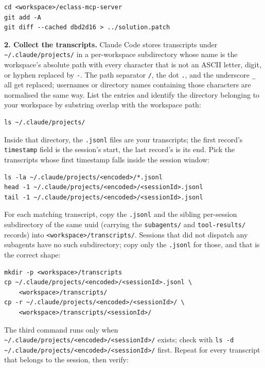 \documentclass[11pt, a4paper]{article}
\begin{document}
\begin{verbatim}
cd <workspace>/eclass-mcp-server
git add -A
git diff --cached dbd2d16 > ../solution.patch
\end{verbatim}

\textbf{2. Collect the transcripts.} Claude Code stores transcripts under \texttt{\textasciitilde/.claude/projects/} in a per-workspace subdirectory whose name is the workspace's absolute path with every character that is not an ASCII letter, digit, or hyphen replaced by \texttt{-}. The path separator \texttt{/}, the dot \texttt{.}, and the underscore \texttt{\_} all get replaced; usernames or directory names containing those characters are normalised the same way. List the entries and identify the directory belonging to your workspace by substring overlap with the workspace path:

\begin{verbatim}
ls ~/.claude/projects/
\end{verbatim}

Inside that directory, the \texttt{.jsonl} files are your transcripts; the first record's \texttt{timestamp} field is the session's start, the last record's is its end. Pick the transcripts whose first timestamp falls inside the session window:

\begin{verbatim}
ls -la ~/.claude/projects/<encoded>/*.jsonl
head -1 ~/.claude/projects/<encoded>/<sessionId>.jsonl
tail -1 ~/.claude/projects/<encoded>/<sessionId>.jsonl
\end{verbatim}

For each matching transcript, copy the \texttt{.jsonl} and the sibling per-session subdirectory of the same uuid (carrying the \texttt{subagents/} and \texttt{tool-results/} records) into \texttt{<workspace>/transcripts/}. Sessions that did not dispatch any subagents have no such subdirectory; copy only the \texttt{.jsonl} for those, and that is the correct shape:

\begin{verbatim}
mkdir -p <workspace>/transcripts
cp ~/.claude/projects/<encoded>/<sessionId>.jsonl \
    <workspace>/transcripts/
cp -r ~/.claude/projects/<encoded>/<sessionId>/ \
    <workspace>/transcripts/<sessionId>/
\end{verbatim}

The third command runs only when \texttt{\textasciitilde/.claude/projects/<encoded>/<sessionId>/} exists; check with \texttt{ls -d \textasciitilde/.claude/projects/<encoded>/<sessionId>/} first. Repeat for every transcript that belongs to the session, then verify:
\end{document}

